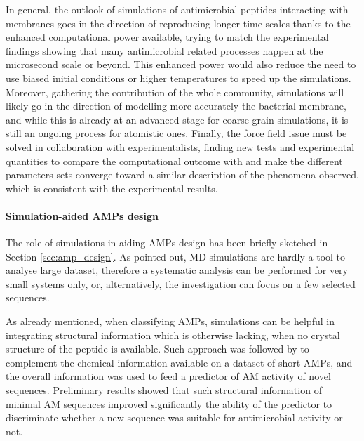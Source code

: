 In general, the outlook of simulations of antimicrobial peptides interacting with membranes goes in the direction of reproducing longer time scales thanks to the enhanced computational power available, trying to match the experimental findings showing that many antimicrobial related processes happen at the microsecond scale or beyond.
%
This enhanced power would also reduce the need to use biased initial conditions or higher temperatures to speed up the simulations.
%
Moreover, gathering the contribution of the whole community, simulations will likely go in the direction of modelling more accurately the bacterial membrane, and while this is already at an advanced stage for coarse-grain simulations, it is still an ongoing process for atomistic ones.
%
Finally, the force field issue must be solved in collaboration with experimentalists, finding new tests and experimental quantities to compare the computational outcome with and make the different parameters sets converge toward a similar description of the phenomena observed, which is consistent with the experimental results.


\paragraph{Simulation-aided AMPs design} \label{sec:design_md_examples}

The role of simulations in aiding AMPs design has been briefly sketched in Section \ref{sec:amp_design}. As pointed out, MD simulations are hardly a tool to analyse large dataset, therefore a systematic analysis can be performed for very small systems only, or, alternatively, the investigation can focus on a few selected sequences.

As already mentioned, when classifying AMPs, simulations can be helpful in integrating structural information which is otherwise lacking, when no crystal structure of the peptide is available. Such approach was followed by \citet{Liu2018} to complement the chemical information available on a dataset of short AMPs, and the overall information was used to feed a predictor of AM activity of novel sequences. Preliminary results showed that such structural information of minimal AM sequences improved significantly the ability of the predictor to discriminate whether a new sequence was suitable for antimicrobial activity or not.

